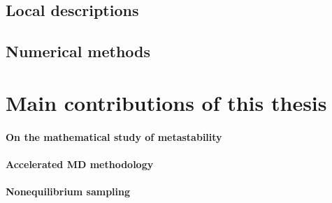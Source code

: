\subsection{Local descriptions}
\subsection{Numerical methods}

\section{Main contributions of this thesis}
\paragraph{On the mathematical study of metastability}
\paragraph{Accelerated MD methodology}
\paragraph{Nonequilibrium sampling}


